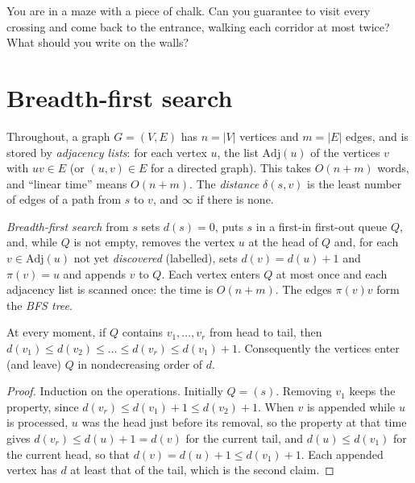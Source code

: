 \begin{think}
You are in a maze with a piece of chalk. Can you guarantee to visit every crossing and come back to the entrance, walking each corridor at most twice?
What should you write on the walls?
\end{think}

\section{Breadth-first search}\label{sec:bfs}

Throughout, a graph $G=(V,E)$ has $n=|V|$ vertices and $m=|E|$ edges, and is stored by \emph{adjacency lists}: for each vertex $u$, the list $\mathrm{Adj}(u)$ of the
vertices $v$ with $uv\in E$ (or $(u,v)\in E$ for a directed graph). This takes $O(n+m)$ words, and ``linear time'' means $O(n+m)$. The \emph{distance} $\delta(s,v)$ is
the least number of edges of a path from $s$ to $v$, and $\infty$ if there is none.

\emph{Breadth-first search} from $s$ sets $d(s)=0$, puts $s$ in a first-in first-out queue $Q$, and, while $Q$ is not empty, removes the vertex $u$ at the head of $Q$ and,
for each $v\in\mathrm{Adj}(u)$ not yet \emph{discovered} (labelled), sets $d(v)=d(u)+1$ and $\pi(v)=u$ and appends $v$ to $Q$. Each vertex enters $Q$ at most once and each
adjacency list is scanned once: the time is $O(n+m)$. The edges $\pi(v)v$ form the \emph{BFS tree}.

\begin{lemma}\label{lem:queue}
At every moment, if $Q$ contains $v_1,\dots,v_r$ from head to tail, then $d(v_1)\le d(v_2)\le\dots\le d(v_r)\le d(v_1)+1$. Consequently the vertices enter (and leave) $Q$ in
nondecreasing order of $d$.
\end{lemma}
\begin{proof}
Induction on the operations. Initially $Q=(s)$. Removing $v_1$ keeps the property, since $d(v_r)\le d(v_1)+1\le d(v_2)+1$. When $v$ is appended while $u$ is processed, $u$ was the
head just before its removal, so the property at that time gives $d(v_r)\le d(u)+1=d(v)$ for the current tail, and $d(u)\le d(v_1)$ for the current head, so that $d(v)=d(u)+1\le d(v_1)+1$.
Each appended vertex has $d$ at least that of the tail, which is the second claim.
\end{proof}

